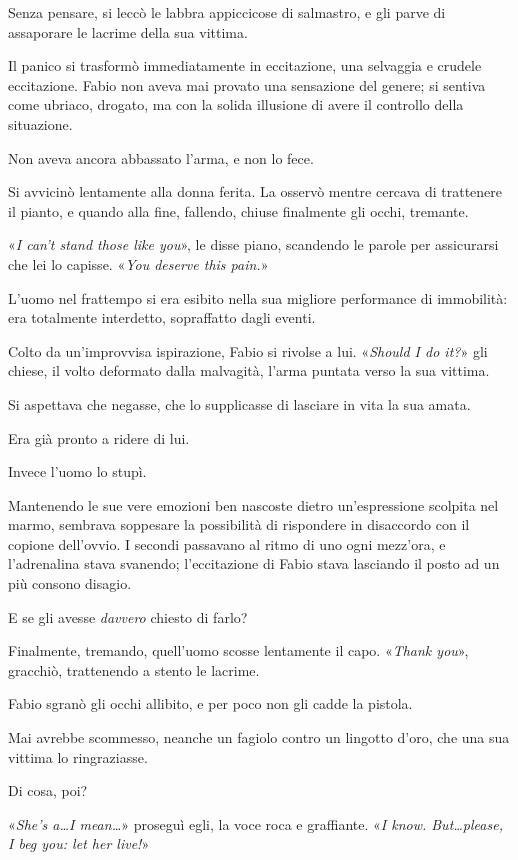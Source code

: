 Senza pensare, si leccò le labbra appiccicose di salmastro, e gli parve di assaporare le lacrime della sua vittima. 

Il panico si trasformò immediatamente in eccitazione, una selvaggia e crudele eccitazione. Fabio non aveva mai provato una sensazione del genere; si sentiva come ubriaco, drogato, ma con la solida illusione di avere il controllo della situazione. 

Non aveva ancora abbassato l'arma, e non lo fece. 

Si avvicinò lentamente alla donna ferita. La osservò mentre cercava di trattenere il pianto, e quando alla fine, fallendo, chiuse finalmente gli occhi, tremante.

«\textit{I can't stand those like you}», le disse piano, scandendo le parole per assicurarsi che lei lo capisse. «\textit{You deserve this pain.}»

L'uomo nel frattempo si era esibito nella sua migliore performance di immobilità: era totalmente interdetto, sopraffatto dagli eventi.

Colto da un'improvvisa ispirazione, Fabio si rivolse a lui. «\textit{Should I do it?}» gli chiese, il volto deformato dalla malvagità, l'arma puntata verso la sua vittima.

Si aspettava che negasse, che lo supplicasse di lasciare in vita la sua amata.

Era già pronto a ridere di lui. 

Invece l'uomo lo stupì. 

Mantenendo le sue vere emozioni ben nascoste dietro un'espressione scolpita nel marmo, sembrava soppesare la possibilità di rispondere in disaccordo con il copione dell'ovvio. I secondi passavano al ritmo di uno ogni mezz'ora, e l'adrenalina stava svanendo; l'eccitazione di Fabio stava lasciando il posto ad un più consono disagio. 

E se gli avesse \textit{davvero} chiesto di farlo? 

Finalmente, tremando, quell'uomo scosse lentamente il capo. «\textit{Thank you}», gracchiò, trattenendo a stento le lacrime.

Fabio sgranò gli occhi allibito, e per poco non gli cadde la pistola.

Mai avrebbe scommesso, neanche un fagiolo contro un lingotto d'oro, che una sua vittima lo ringraziasse.

Di cosa, poi?

«\textit{She's a\ldots I mean\ldots}» proseguì egli, la voce roca e graffiante. «\textit{I know. But\ldots please, I beg you: let her live!}»


